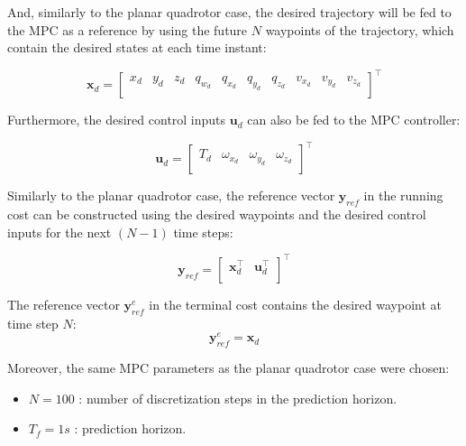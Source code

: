 \documentclass{thesisreport}
\begin{document}
And, similarly to the planar quadrotor case, the desired trajectory will be fed to the MPC as a reference by using the future $N$ waypoints of the trajectory, which contain the desired states at each time instant:

\begin{equation}
	\bm{x}_d = \begin{bmatrix}
		x_d & y_d & z_d & q_{w_d} & q_{x_d} & q_{y_d} & q_{z_d} & v_{x_d} & v_{y_d} & v_{z_d}\\
	\end{bmatrix}^{\intercal}
\end{equation}







Furthermore, the desired control inputs $\bm{u}_d$ can also be fed to the MPC controller:


\begin{equation}
	\bm{u}_d = \begin{bmatrix}
		T_d & \omega_{x_d} & \omega_{y_d} & \omega_{z_d} \\
	\end{bmatrix}^{\intercal}
\end{equation}

 Similarly to the planar quadrotor case, the reference vector $\bm{y}_{ref}$ in the running cost can be constructed using the desired waypoints and the desired control inputs for the next $(N-1)$ time steps:

\begin{equation}
	\bm{y}_{ref} = \begin{bmatrix}
		\bm{x}_d^{\intercal} & \bm{u}_d^{\intercal} \\
	\end{bmatrix}^{\intercal}
\end{equation}

The reference vector $\bm{y}_{ref}^e$ in the terminal cost contains the desired waypoint at time step $N$:
\begin{equation}
	\bm{y}_{ref}^e = \bm{x}_d
\end{equation}





Moreover, the same MPC parameters as the planar quadrotor case were chosen:
\begin{itemize}
	\item $N = 100$ : number of discretization steps in the prediction horizon.
	\item $T_f = 1s$ : prediction horizon.
\end{itemize}
\end{document}
